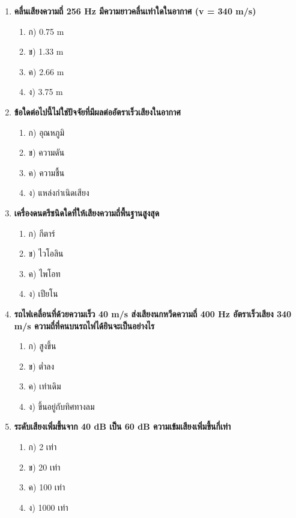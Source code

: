 \documentclass[12pt]{article}
\begin{document}
\begin{enumerate}
\begin{enumerate}
\item ก) 444 Hz
\item ข) 500 Hz
\item ค) 556 Hz
\item ง) 600 Hz
\end{enumerate}
\item \textbf{คลื่นเสียงความถี่ 256 Hz มีความยาวคลื่นเท่าใดในอากาศ (v = 340 m/s)}
\begin{enumerate}
\item ก) 0.75 m
\item ข) 1.33 m
\item ค) 2.66 m
\item ง) 3.75 m
\end{enumerate}
\item \textbf{ข้อใดต่อไปนี้ไม่ใช่ปัจจัยที่มีผลต่ออัตราเร็วเสียงในอากาศ}
\begin{enumerate}
\item ก) อุณหภูมิ
\item ข) ความดัน
\item ค) ความชื้น
\item ง) แหล่งกำเนิดเสียง
\end{enumerate}
\item \textbf{เครื่องดนตรีชนิดใดที่ให้เสียงความถี่พื้นฐานสูงสุด}
\begin{enumerate}
\item ก) กีตาร์
\item ข) ไวโอลิน
\item ค) ไพโอท
\item ง) เปียโน
\end{enumerate}
\item \textbf{รถไฟเคลื่อนที่ด้วยความเร็ว 40 m/s ส่งเสียงนกหวีดความถี่ 400 Hz อัตราเร็วเสียง 340 m/s ความถี่ที่คนบนรถไฟได้ยินจะเป็นอย่างไร}
\begin{enumerate}
\item ก) สูงขึ้น
\item ข) ต่ำลง
\item ค) เท่าเดิม
\item ง) ขึ้นอยู่กับทิศทางลม
\end{enumerate}
\item \textbf{ระดับเสียงเพิ่มขึ้นจาก 40 dB เป็น 60 dB ความเข้มเสียงเพิ่มขึ้นกี่เท่า}
\begin{enumerate}
\item ก) 2 เท่า
\item ข) 20 เท่า
\item ค) 100 เท่า
\item ง) 1000 เท่า

\end{enumerate}
\end{enumerate}
\end{document}
